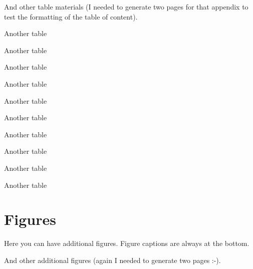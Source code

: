 \documentclass[msc,oneside]{ubcthesis}%
\begin{document}
\newpage
And other table materials (I needed to generate two pages for that
appendix to test the formatting of the table of content).

\begin{table}
\caption{Another table}
\end{table}

\begin{table}
\caption{Another table}
\end{table}
\begin{table}
\caption{Another table}
\end{table}
\begin{table}
\caption{Another table}
\end{table}
\begin{table}
\caption{Another table}
\end{table}

\begin{table}
\caption{Another table}
\end{table}
\begin{table}
\caption{Another table}
\end{table}
\begin{table}
\caption{Another table}
\end{table}
\begin{table}
\caption{Another table}
\end{table}
\begin{table}
\caption{Another table}
\end{table}

\chapter{Figures}
Here you can have additional figures. Figure captions are always at the bottom.

\newpage

And other additional figures (again I needed to generate two pages :-).
\end{document}
